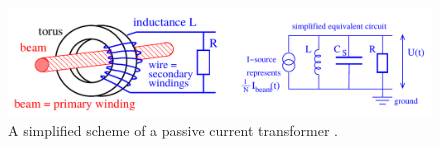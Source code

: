 \begin{figure}[!ht]
	\begin{center}
		\includegraphics[width=\textwidth]{02_BeamDiag/figures/fig000_CT}
	\end{center}
	\caption[A simplified schema of a passive current transformer]{A simplified scheme of a passive current transformer \cite{ForckJUAS}.}
	\label{chap2:fig:CT}
\end{figure}
